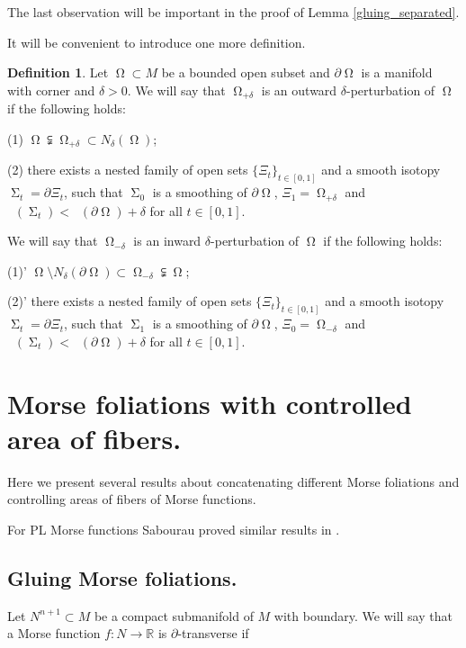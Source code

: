 \documentclass[12pt]{amsart}
\DeclareMathOperator{\Hn}{\mathcal{H}^n}
\DeclareMathOperator{\Om}{\Omega}
\DeclareMathOperator{\Si}{\Sigma}
\theoremstyle{definition}
\newtheorem{definition}[theorem]{Definition}
\begin{document}
The last observation will be important in the proof of 
Lemma \ref*{gluing_separated}.

It will be convenient to introduce one more definition.

\begin{definition} \label{delta-perturbation}
Let $\Om \subset M$ be a bounded open subset 
and $\partial \Om$ is a manifold with corner
and $\delta>0$.
We will say that $\Om_{+ \delta}$ is an outward 
$\delta$-perturbation of $\Om$ if the following holds:

(1) $\Om \subsetneqq \Om_{+ \delta} \subset N_{\delta}(\Om)$;

(2) there exists a nested family of open sets
$\{\Xi_t\}_{t \in [0,1]}$ and a smooth isotopy $\Si_t = \partial \Xi_t$,
such that $\Si_0$ is a smoothing of $\partial \Om$,
$\Xi_1 = \Om_{+ \delta}$
and $\Hn(\Si_t) < \Hn(\partial \Om) +\delta$
for all $t \in [0,1]$.

We will say that $\Om_{- \delta}$ is an inward 
$\delta$-perturbation of $\Om$ if the following holds:

(1)' $\Om \setminus N_{\delta}(\partial \Om) \subset \Om_{-\delta} \subsetneqq \Om$;

(2)' there exists a nested family of open sets
$\{\Xi_t\}_{t \in [0,1]}$ and a smooth isotopy $\Si_t = \partial \Xi_t$,
such that $\Si_1$ is a smoothing of $\partial \Om$,
$\Xi_0 = \Om_{- \delta}$
and $\Hn(\Si_t) < \Hn(\partial \Om) +\delta$
for all $t \in [0,1]$.

\end{definition}

\section{Morse foliations with controlled
area of fibers.}


Here we present several results about
concatenating different Morse foliations and
controlling areas of fibers of
Morse functions.

For PL Morse functions Sabourau proved similar results in \cite{Sa}.


\subsection{Gluing Morse foliations.}

Let $N^{n+1} \subset M$ be a compact submanifold of $M$ 
with boundary.
We will say that a Morse function $f: N \rightarrow \mathbb{R}$ is
$\partial$-transverse if 
\end{document}

